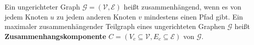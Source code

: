 \begin{definition}[Zusammenhangskomponente]\label{def:komponente}
Ein ungerichteter Graph $\mathcal{G} = (\mathcal{V}, \mathcal{E})$ heißt zusammenhängend, wenn es von jedem Knoten $u$ zu jedem anderen Knoten $v$ mindestens einen Pfad gibt.
Ein maximaler zusammenhängender Teilgraph eines ungerichteten Graphen $\mathcal{G}$ heißt \textbf{Zusammenhangskomponente} $C = (V_c \subseteq \mathcal{V}, E_c \subseteq \mathcal{E})$ von $\mathcal{G}$. 
\end{definition}
